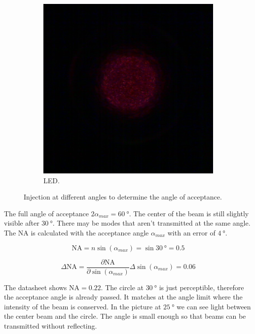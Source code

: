 \documentclass[a4paper, 12pt]{paper}
\begin{document}
\begin{figure}[H]
\begin{subfigure}[b]{0.45\textwidth}
        \includegraphics[width=\textwidth]{img/30_deg}
        \caption{LED.}
    \end{subfigure}
    \caption{Injection at different angles to determine the angle of acceptance.}
\label{fig:acceptance_angle}
\end{figure}


The full angle of acceptance $2 \alpha_{max} = \SI{60}{\degree}$.
The center of the beam is still slightly visible after $\SI{30}{\degree}$.
There may be modes that aren't transmitted at the same angle.
The NA is calculated with the acceptance angle $\alpha_{max}$ with an error of $\SI{4}{\degree}$.

\begin{equation}
    \mbox{NA} = n \sin \left( \alpha_{max} \right) = \sin \SI{30}{\degree} = 0.5
    \label{equ:NA}
\end{equation}

\begin{equation}
    \Delta \mbox{NA} = \frac{\partial \mbox{NA}}{\partial \sin \left( \alpha_{max} \right)} \Delta \sin \left( \alpha_{max} \right)= 0.06
    \label{equ:NA_err}
\end{equation}

The datasheet shows $\mbox{NA} = 0.22$.
The circle at $\SI{30}{\degree}$ is just perceptible, therefore the acceptance angle is already passed.
It matches at the angle limit where the intensity of the beam is conserved.
In the picture at $\SI{25}{\degree}$ we can see light between the center beam and the circle.
The angle is small enough so that beams can be transmitted without reflecting.
\end{document}
